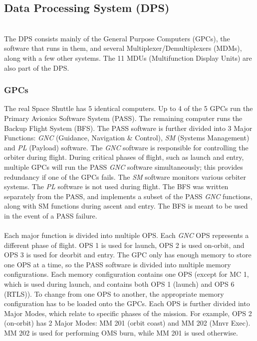 \documentclass[Space_Shuttle_Vessel_Manual.tex]{subfiles}
\begin{document}
\subsection{Data Processing System (DPS)}
\begin{multicols*}{2}
\renewcommand{\cfttoctitlefont}{\bf}
\localtableofcontents
\noindent
\\
The DPS consists mainly of the General Purpose Computers (GPCs), the software that runs in them, and several Multiplexer/Demultiplexers (MDMs), along with a few other systems. The 11 MDUs (Multifunction Display Units) are also part of the DPS.
\subsubsection{GPCs}
The real Space Shuttle has 5 identical computers. Up to 4 of the 5 GPCs run the Primary Avionics Software System (PASS). The remaining computer runs the Backup Flight System (BFS). The PASS software is further divided into 3 Major Functions: \textit{GNC} (Guidance, Navigation \& Control), \textit{SM} (Systems Management) and \textit{PL} (Payload) software. The \textit{GNC} software is responsible for controlling the orbiter during flight. During critical phases of flight, such as launch and entry, multiple GPCs will run the PASS \textit{GNC} software simultaneously; this provides redundancy if one of the GPCs fails. The \textit{SM} software monitors various orbiter systems. The \textit{PL} software is not used during flight. The BFS was written separately from the PASS, and implements a subset of the PASS \textit{GNC} functions, along with SM functions during ascent and entry. The BFS is meant to be used in the event of a PASS failure.\\
\\
Each major function is divided into multiple OPS. Each \textit{GNC} OPS represents a different phase of flight. OPS 1 is used for launch, OPS 2 is used on-orbit, and OPS 3 is used for deorbit and entry. The GPC only has enough memory to store one OPS at a time, so the PASS software is divided into multiple memory configurations. Each memory configuration contains one OPS (except for MC 1, which is used during launch, and contains both OPS 1 (launch) and OPS 6 (RTLS)). To change from one OPS to another, the appropriate memory configuration has to be loaded onto the GPCs. Each OPS is further divided into Major Modes, which relate to specific phases of the mission. For example, OPS 2 (on-orbit) has 2 Major Modes: MM 201 (orbit coast) and MM 202 (Mnvr Exec). MM 202 is used for performing OMS burn, while MM 201 is used otherwise.\\

\end{multicols*}
\end{document}
